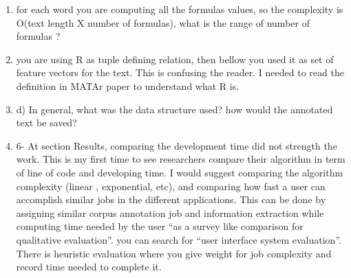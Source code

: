 \begin{enumerate}[leftmargin=0mm,label=\bfseries CommentR3.\arabic*]


\item \label{Review.3.21}
for each word you are computing all the formulas values, 
so the complexity is O(text length X number of formulas), 
what is the range of number of formulas ?




\item \label{Review.3.22}
you are using R as tuple defining relation, 
then bellow you used it as set of feature vectors for the text. 
This is confusing the reader. 
I needed to read the definition in MATAr paper to understand 
what R is.




\item \label{Review.3.23}
d) In general, what was the data structure used? 
how would the annotated text be saved?




\item \label{Review.3.24}
6- At section Results, comparing the development time 
did not strength the work. 
This is my first time to see researchers compare their 
algorithm in term of line of code and developing time. 
I would suggest comparing the algorithm complexity 
(linear , exponential, etc), and comparing how fast a user can 
accomplish similar jobs in the different applications. 
This can be done by assigning similar corpus annotation job 
and information extraction while computing time needed by 
the user 
``as a survey like comparison for qualitative evaluation''. 
you can search for ``user interface system evaluation''. 
There is heuristic evaluation where you give weight for job 
complexity and record time needed to complete it.


\end{enumerate}
